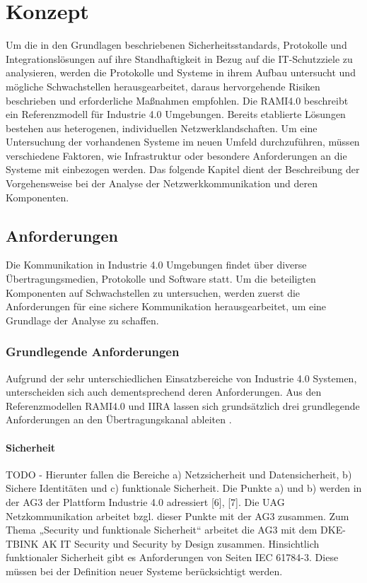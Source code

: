 \chapter{Konzept}

Um die in den Grundlagen beschriebenen Sicherheitsstandards, Protokolle und Integrationslösungen auf ihre Standhaftigkeit in Bezug auf die IT-Schutzziele zu analysieren, werden die Protokolle und Systeme in ihrem Aufbau untersucht und mögliche Schwachstellen herausgearbeitet, daraus hervorgehende Risiken beschrieben und erforderliche Maßnahmen empfohlen. Die \ac{RAMI4.0} beschreibt ein Referenzmodell für Industrie 4.0 Umgebungen. Bereits etablierte Lösungen bestehen aus heterogenen, individuellen Netzwerklandschaften. Um eine Untersuchung der vorhandenen Systeme im neuen Umfeld durchzuführen, müssen verschiedene Faktoren, wie Infrastruktur oder besondere Anforderungen an die Systeme mit einbezogen werden. Das folgende Kapitel dient der Beschreibung der Vorgehensweise bei der Analyse der Netzwerkkommunikation und deren Komponenten.

\section{Anforderungen}
Die Kommunikation in Industrie 4.0 Umgebungen findet über diverse Übertragungsmedien, Protokolle und Software statt. Um die beteiligten Komponenten auf Schwachstellen zu untersuchen, werden zuerst die Anforderungen für eine sichere Kommunikation herausgearbeitet, um eine Grundlage der Analyse zu schaffen.

\subsection{Grundlegende Anforderungen}
Aufgrund der sehr unterschiedlichen Einsatzbereiche von Industrie 4.0 Systemen, unterscheiden sich auch dementsprechend deren Anforderungen. Aus den Referenzmodellen \ac{RAMI4.0} und \ac{IIRA} lassen sich grundsätzlich drei grundlegende Anforderungen an den Übertragungskanal ableiten \cite{BMWiNeCon2016}.

\subsubsection{Sicherheit}
TODO - Hierunter fallen die Bereiche a) Netzsicherheit und Datensicherheit, b) Sichere Identitäten und c) funktionale Sicherheit. Die Punkte a) und b) werden in der AG3 der Plattform Industrie 4.0 adressiert [6], [7]. Die UAG Netzkommunikation arbeitet bzgl. dieser Punkte mit der AG3 zusammen. Zum Thema „Security und funktionale Sicherheit“ arbeitet die AG3 mit dem DKE-TBINK AK IT Security und Security by Design zusammen. Hinsichtlich funktionaler Sicherheit gibt es Anforderungen von Seiten IEC 61784-3. Diese müssen bei der Definition neuer Systeme berücksichtigt werden.

